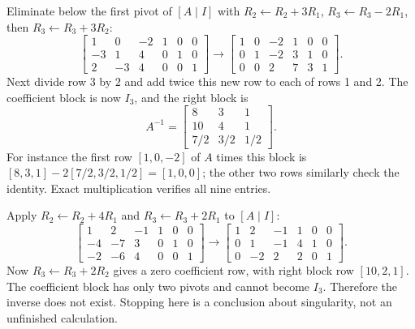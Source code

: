 Eliminate below the first pivot of $[A\mid I]$ with
$R_2\gets R_2+3R_1$, $R_3\gets R_3-2R_1$, then
$R_3\gets R_3+3R_2$:
\[
 \left[\begin{array}{rrr|rrr}1&0&-2&1&0&0\\-3&1&4&0&1&0\\2&-3&4&0&0&1\end{array}\right]
 \longrightarrow
 \left[\begin{array}{rrr|rrr}1&0&-2&1&0&0\\0&1&-2&3&1&0\\0&0&2&7&3&1\end{array}\right].
\]
Next divide row 3 by $2$ and add twice this new row to each of rows 1 and 2.
The coefficient block is now $I_3$, and the right block is
\[
 \boxed{A^{-1}=\begin{bmatrix}8&3&1\\10&4&1\\7/2&3/2&1/2\end{bmatrix}}.
\]
For instance the first row $[1,0,-2]$ of $A$ times this block is
$[8,3,1]-2[7/2,3/2,1/2]=[1,0,0]$; the other two rows similarly
check the identity. Exact multiplication verifies all nine entries.

Apply $R_2\gets R_2+4R_1$ and $R_3\gets R_3+2R_1$ to $[A\mid I]$:
\[
 \left[\begin{array}{rrr|rrr}1&2&-1&1&0&0\\-4&-7&3&0&1&0\\-2&-6&4&0&0&1\end{array}\right]
 \longrightarrow
 \left[\begin{array}{rrr|rrr}1&2&-1&1&0&0\\0&1&-1&4&1&0\\0&-2&2&2&0&1\end{array}\right].
\]
Now $R_3\gets R_3+2R_2$ gives a zero coefficient row, with right
block row $[10,2,1]$. The coefficient block has only two pivots and cannot
become $I_3$. Therefore the inverse does not exist. Stopping here is a
conclusion about singularity, not an unfinished calculation.

